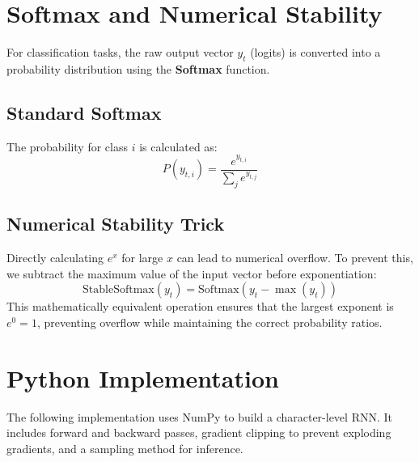 \documentclass{article}
\begin{document}
\section{Softmax and Numerical Stability}
For classification tasks, the raw output vector $y_t$ (logits) is converted into a probability distribution using the \textbf{Softmax} function.

\subsection{Standard Softmax}
The probability for class $i$ is calculated as:
\begin{equation}
P(y_{t,i}) = \frac{e^{y_{t,i}}}{\sum_{j} e^{y_{t,j}}}
\end{equation}

\subsection{Numerical Stability Trick}
Directly calculating $e^{x}$ for large $x$ can lead to numerical overflow. To prevent this, we subtract the maximum value of the input vector before exponentiation:
\begin{equation}
\text{StableSoftmax}(y_t) = \text{Softmax}(y_t - \max(y_t))
\end{equation}
This mathematically equivalent operation ensures that the largest exponent is $e^0 = 1$, preventing overflow while maintaining the correct probability ratios.

\section{Python Implementation}
The following implementation uses NumPy to build a character-level RNN. It includes forward and backward passes, gradient clipping to prevent exploding gradients, and a sampling method for inference.
\end{document}

